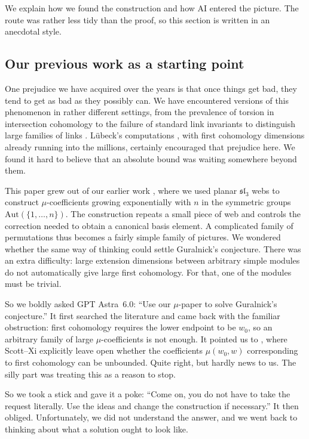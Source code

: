 \documentclass[a4paper,11pt]{amsart}
\numberwithin{equation}{subsection}
\theoremstyle{plain}
\theoremstyle{definition}
\theoremstyle{remark}
\begin{document}
We explain how we found the construction and how AI entered the picture. The route was rather less tidy than the proof, so this section is written in an anecdotal style.

\subsection{Our previous work as a starting point}

One prejudice we have acquired over the years is that once
things get bad, they tend to get as bad as they possibly can.
We have encountered versions of this phenomenon in rather
different settings, from the prevalence of torsion in
intersection cohomology \cite{TorsionProliferation} to the
failure of standard link invariants to distinguish large
families of links \cite{LinkDetection}.
L\"ubeck's computations \cite{Luebeck}, with first cohomology
dimensions already running into the millions, certainly
encouraged that prejudice here. We found it hard to believe
that an absolute bound was waiting somewhere beyond them.

This paper grew out of our earlier work \cite{Finite}, where
we used planar $\mathfrak{sl}_3$ webs to construct
$\mu$-coefficients growing exponentially with $n$ in
the symmetric groups $\mathrm{Aut}(\{1,\dots,n\})$. The construction repeats a small piece
of web and controls the correction needed to obtain a
canonical basis element. A complicated family of permutations
thus becomes a fairly simple family of pictures.
We wondered whether the same way of thinking could settle
Guralnick's conjecture. There was an extra difficulty:
large extension dimensions between arbitrary simple modules
do not automatically give large first cohomology. For that,
one of the modules must be trivial.

So we boldly asked GPT Astra~6.0:
``Use our $\mu$-paper to solve Guralnick's conjecture.''
It first searched the literature and came back with the
familiar obstruction: first cohomology requires the lower
endpoint to be $w_0$, so an arbitrary family of large
$\mu$-coefficients is not enough.
It pointed us to \cite[Section~4, final remark]{SX}, where
Scott--Xi explicitly leave open whether the coefficients
$\mu(w_0,w)$ corresponding to first cohomology can be
unbounded. Quite right, but hardly news to us.
The silly part was treating this as a reason to stop.

So we took a stick and gave it a poke:
``Come on, you do not have to take the request literally.
Use the ideas and change the construction if necessary.''
It then obliged. Unfortunately, we did not understand
the answer, and we went back to thinking about
what a solution ought to look like.
\end{document}
